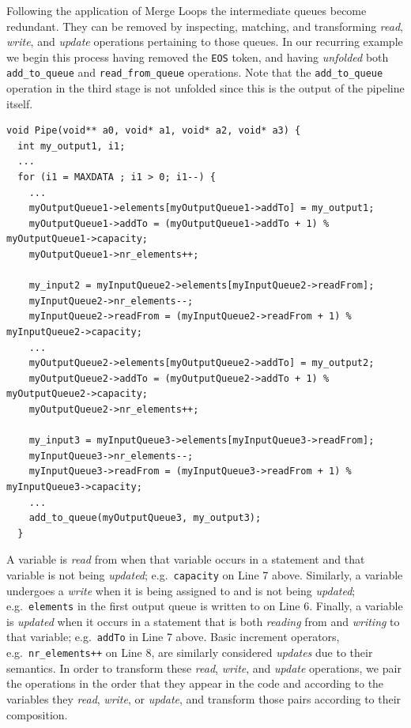 Following the application of Merge Loops the intermediate queues become redundant.
%
They can be removed by inspecting, matching, and transforming \emph{read}, \emph{write}, and \emph{update} operations pertaining to those queues.
%
In our recurring example we begin this process having removed the \lstinline{EOS}  token, and having \emph{unfolded} both \lstinline|add_to_queue| and \lstinline|read_from_queue| operations. Note that the \lstinline|add_to_queue| operation in the third stage is not unfolded since this is the output of the pipeline itself.
%
\begin{lstlisting}
void Pipe(void** a0, void* a1, void* a2, void* a3) {
  int my_output1, i1;
  ...
  for (i1 = MAXDATA ; i1 > 0; i1--) {
    ...
    myOutputQueue1->elements[myOutputQueue1->addTo] = my_output1;
    myOutputQueue1->addTo = (myOutputQueue1->addTo + 1) % myOutputQueue1->capacity;
    myOutputQueue1->nr_elements++;

    my_input2 = myInputQueue2->elements[myInputQueue2->readFrom];
    myInputQueue2->nr_elements--;
    myInputQueue2->readFrom = (myInputQueue2->readFrom + 1) % myInputQueue2->capacity;
    ...
    myOutputQueue2->elements[myOutputQueue2->addTo] = my_output2;
    myOutputQueue2->addTo = (myOutputQueue2->addTo + 1) % myOutputQueue2->capacity;
    myOutputQueue2->nr_elements++;

    my_input3 = myInputQueue3->elements[myInputQueue3->readFrom];
    myInputQueue3->nr_elements--;
    myInputQueue3->readFrom = (myInputQueue3->readFrom + 1) % myInputQueue3->capacity;
    ...
    add_to_queue(myOutputQueue3, my_output3);
  }
\end{lstlisting}
%
A variable is \emph{read} from when that variable occurs in a statement and that variable is not being \emph{updated}; e.g.\ \lstinline|capacity| on Line 7 above.
%
Similarly, a variable undergoes a \emph{write} when it is being assigned to and is not being \emph{updated}; e.g.\ \lstinline|elements|
in the first output queue is written to on Line 6.
%
Finally, a variable is \emph{updated} when it occurs in a statement that is both \emph{reading} from and \emph{writing} to that variable; e.g.\  \lstinline|addTo| in Line 7 above. Basic increment operators, e.g.\  \lstinline|nr_elements++| on Line 8, are similarly considered \emph{updates} due to their semantics.
%
%
In order to transform these \emph{read}, \emph{write}, and \emph{update} operations, we pair the operations in the order that they appear in the code and according to the variables they \emph{read}, \emph{write}, or \emph{update}, and transform those pairs according to their composition.
